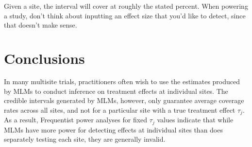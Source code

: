 \documentclass[]{article}
\begin{document}
Given a site, the interval will cover at roughly the stated percent.
When powering a study, don't think about inputting an effect size that you'd like to detect, since that doesn't make sense.





\section{Conclusions}

In many multisite trials, practitioners often wish to use the estimates produced by MLMs to conduct inference on treatment effects at individual sites.
The credible intervals generated by MLMs, however, only guarantee average coverage rates across all sites, and not for a particular site with a true treatment effect $\tau_j$.
As a result, Frequentist power analyses for fixed $\tau_j$ values indicate that while MLMs have more power for detecting effects at individual sites than does separately testing each site, they are generally invalid.
\end{document}
